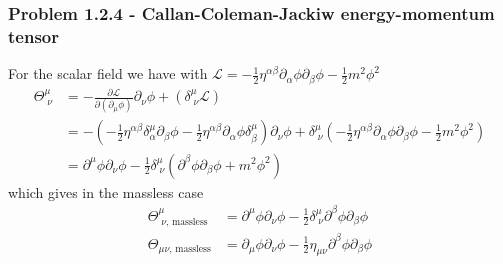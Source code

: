 \documentclass[10pt,a4paper]{book}
\theoremstyle{definition}
\begin{document}
\subsubsection{Problem 1.2.4 - Callan-Coleman-Jackiw energy-momentum tensor}
For the scalar field we have with $\mathcal{L}=-\frac{1}{2}\eta^{\alpha\beta}\partial_\alpha\phi\partial_\beta\phi-\frac{1}{2}m^2\phi^2$
\begin{align}
    \Theta^\mu_{\;\nu}&=-\frac{\partial\mathcal{L}}{\partial(\partial_\mu\phi)}\partial_\nu\phi+(\delta^\mu_{\;\nu}\mathcal{L})\\
    &=-\left(-\frac{1}{2}\eta^{\alpha\beta}\delta^\mu_{\alpha}\partial_\beta\phi-\frac{1}{2}\eta^{\alpha\beta}\partial_\alpha\phi\delta^\mu_{\beta}\right)\partial_\nu\phi +\delta^\mu_{\;\nu}\left(-\frac{1}{2}\eta^{\alpha\beta}\partial_\alpha\phi\partial_\beta\phi-\frac{1}{2}m^2\phi^2\right)\\
    &=\partial^\mu\phi\partial_\nu\phi -\frac{1}{2}\delta^\mu_{\;\nu}(\partial^\beta\phi\partial_\beta\phi+m^2\phi^2)
\end{align}
which gives in the massless case
\begin{align}
    \Theta^\mu_{\;\nu\text{, massless}}&=\partial^\mu\phi\partial_\nu\phi -\frac{1}{2}\delta^\mu_{\;\nu}\partial^\beta\phi\partial_\beta\phi\\
    \Theta_{\mu\nu\text{, massless}}&=\partial_\mu\phi\partial_\nu\phi -\frac{1}{2}\eta_{\mu\nu}\partial^\beta\phi\partial_\beta\phi
\end{align}
\end{document}
